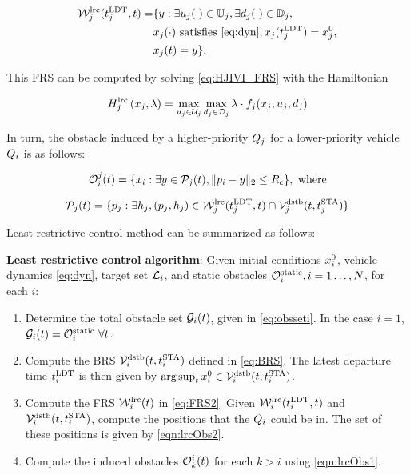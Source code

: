 \begin{equation}
\label{eq:FRS2}
\begin{aligned}
\frs_j^\text{lrc}(\ldt_j, t) = & \{y: \exists \ctrl_j(\cdot)\in\cfset_j, \exists \dstb_j(\cdot) \in \dfset_j, \\
& \state_j(\cdot) \text{ satisfies \eqref{eq:dyn}}, \state_j(\ldt_j) = \state_{j}^0,\\
& \state_j(t) = y\}.
\end{aligned}
\end{equation}

This FRS can be computed by solving \eqref{eq:HJIVI_FRS} with the Hamiltonian

\begin{equation}
H_j^\text{lrc}\left(x_j, \lambda\right) = \max_{u_j \in \mathcal{U}_j} \max_{d_j \in \mathcal{D}_j} \lambda \cdot f_j(x_j, u_j, d_j)
\end{equation}

In turn, the obstacle induced by a higher-priority $Q_j$ for a lower-priority vehicle $Q_i$ is as follows:

\begin{equation}
\label{eqn:lrcObs1}
\ioset_i^j(t) = \{\state_i: \exists y \in \pfrs_j(t), \|\pos_i - y\|_2 \le \rc \}, \text{ where}
\end{equation}

\begin{equation}
\label{eqn:lrcObs2}
\pfrs_j(t) = \{p_j: \exists \npos_j, (p_j, \npos_j) \in \frs_j^\text{lrc}(\ldt_j, t) \cap \brs_j^\text{dstb}(t, \sta_j) \} 
\end{equation}

Least restrictive control method can be summarized as follows:
\begin{alg}
\label{alg:lrc}
\textbf{Least restrictive control algorithm}: Given initial conditions $x_i^0$, vehicle dynamics \eqref{eq:dyn}, target set $\mathcal{L}_i$, and static obstacles $\mathcal{O}^\text{static}_i, i = 1\ldots, N$, for each $i$:
\begin{enumerate}
\item Determine the total obstacle set $\mathcal{G}_i(t)$, given in \eqref{eq:obsseti}. In the case $i=1$, $\mathcal{G}_i(t) = \mathcal{O}^\text{static}_i ~ \forall t$.
\item Compute the BRS $\mathcal{V}_i^\text{dstb}(t, t^\text{STA}_i)$ defined in \eqref{eq:BRS}. The latest departure time $t^\text{LDT}_i$ is then given by $\arg \sup_t x_{i}^0 \in \mathcal{V}_i^\text{dstb}(t, t^\text{STA}_i)$.
\item Compute the FRS $\mathcal{W}_i^\text{lrc}(t)$ in \eqref{eq:FRS2}. Given $\mathcal{W}_i^\text{lrc}(t^\text{LDT}_i, t)$ and $\mathcal{V}_i^\text{dstb}(t, t^\text{STA}_i)$, compute the positions that the $Q_i$ could be in. The set of these positions is given by \eqref{eqn:lrcObs2}.
\item Compute the induced obstacles $\mathcal{O}_k^i(t)$ for each $k>i$ using \eqref{eqn:lrcObs1}.
\end{enumerate}
\end{alg}

